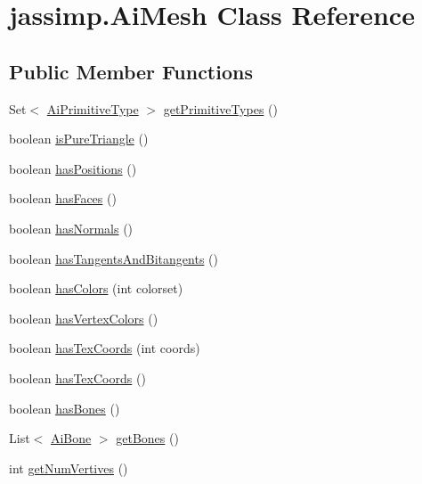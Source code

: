 \hypertarget{classjassimp_1_1_ai_mesh}{\section{jassimp.\+Ai\+Mesh Class Reference}
\label{classjassimp_1_1_ai_mesh}
}
\subsection*{Public Member Functions}
\begin{DoxyCompactItemize}
\item 
Set$<$ \hyperlink{enumjassimp_1_1_ai_primitive_type}{Ai\+Primitive\+Type} $>$ \hyperlink{classjassimp_1_1_ai_mesh_a507049804efb042d6262ff27880705f0}{get\+Primitive\+Types} ()
\item 
boolean \hyperlink{classjassimp_1_1_ai_mesh_a833ff375aed60ac78c83af1209762e6c}{is\+Pure\+Triangle} ()
\item 
boolean \hyperlink{classjassimp_1_1_ai_mesh_a3ce02d9155a0dba1ac60bccb8e7c4716}{has\+Positions} ()
\item 
boolean \hyperlink{classjassimp_1_1_ai_mesh_a3ab2af81d7fff77e7c1d752e5d2a5ead}{has\+Faces} ()
\item 
boolean \hyperlink{classjassimp_1_1_ai_mesh_a65b96683a739d3b0d137bd8c56e6cef6}{has\+Normals} ()
\item 
boolean \hyperlink{classjassimp_1_1_ai_mesh_a9b22d95cc721f8052a21f9f6ba66702f}{has\+Tangents\+And\+Bitangents} ()
\item 
boolean \hyperlink{classjassimp_1_1_ai_mesh_a8c4b8804333585d1185e17ae0e527c84}{has\+Colors} (int colorset)
\item 
boolean \hyperlink{classjassimp_1_1_ai_mesh_a00dba3a644fb26076e9296109bdb9aa5}{has\+Vertex\+Colors} ()
\item 
boolean \hyperlink{classjassimp_1_1_ai_mesh_ac36f43841dbba11aeba50b929d257fe2}{has\+Tex\+Coords} (int coords)
\item 
boolean \hyperlink{classjassimp_1_1_ai_mesh_a4cf5971c9e6f01b72726d6dfd9f1be57}{has\+Tex\+Coords} ()
\item 
boolean \hyperlink{classjassimp_1_1_ai_mesh_ad221ad4fea380aee8ace9b93407bc6c0}{has\+Bones} ()
\item 
List$<$ \hyperlink{classjassimp_1_1_ai_bone}{Ai\+Bone} $>$ \hyperlink{classjassimp_1_1_ai_mesh_af907276e395e54140a12c5208069bb0b}{get\+Bones} ()
\item 
int \hyperlink{classjassimp_1_1_ai_mesh_a0cd39e4728e167bdced9325949810bed}{get\+Num\+Vertives} ()

\end{DoxyCompactItemize}
